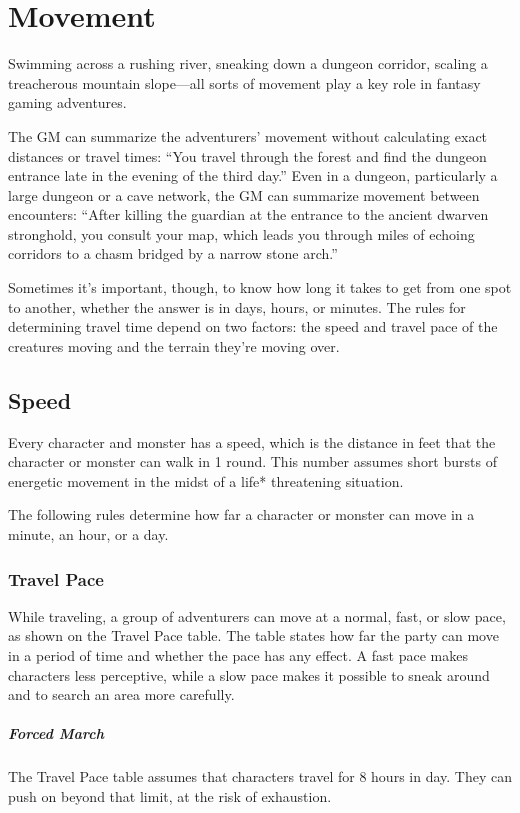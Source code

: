 \section{Movement}

Swimming across a rushing river, sneaking down a dungeon corridor, scaling a treacherous mountain slope—all sorts of movement play a key role in fantasy gaming adventures.

The GM can summarize the adventurers' movement without calculating exact distances or travel times: “You travel through the forest and find the dungeon entrance late in the evening of the third day.” Even in a dungeon, particularly a large dungeon or a cave network, the GM can summarize movement between encounters: “After killing the guardian at the entrance to the ancient dwarven stronghold, you consult your map, which leads you through miles of echoing corridors to a chasm bridged by a narrow stone arch.”

Sometimes it's important, though, to know how long it takes to get from one spot to another, whether the answer is in days, hours, or minutes. The rules for determining travel time depend on two factors: the speed and travel pace of the creatures moving and the terrain they're moving over.

\subsection{Speed}

Every character and monster has a speed, which is the distance in feet that the character or monster can walk in 1 round. This number assumes short bursts of energetic movement in the midst of a life* threatening situation.

The following rules determine how far a character or monster can move in a minute, an hour, or a day.

\subsubsection{Travel Pace}

While traveling, a group of adventurers can move at a normal, fast, or slow pace, as shown on the Travel Pace table. The table states how far the party can move in a period of time and whether the pace has any effect. A fast pace makes characters less perceptive, while a slow pace makes it possible to sneak around and to search an area more carefully.

\subparagraph*{Forced March} The Travel Pace table assumes that characters travel for 8 hours in day. They can push on beyond that limit, at the risk of exhaustion.

